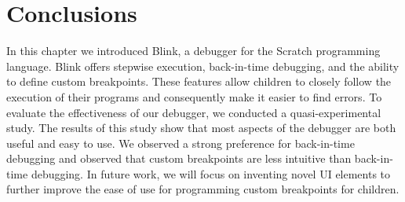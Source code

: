 \documentclass[../main]{subfiles}
\begin{document}
\section{Conclusions}\label{sec:blink-conclusions}
In this chapter we introduced Blink, a debugger for the Scratch programming language.
Blink offers stepwise execution, back-in-time debugging, and the ability to define custom breakpoints.
These features allow children to closely follow the execution of their programs and consequently make it easier to find errors.
To evaluate the effectiveness of our debugger, we conducted a quasi-experimental study.
The results of this study show that most aspects of the debugger are both useful and easy to use.
We observed a strong preference for back-in-time debugging and observed that custom breakpoints are less intuitive than back-in-time debugging.
In future work, we will focus on inventing novel UI elements to further improve the ease of use for programming custom breakpoints for children.
\end{document}
